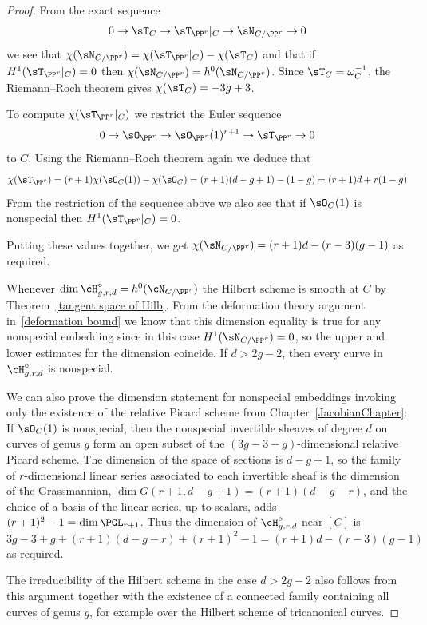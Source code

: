 \begin{proof}
From the exact sequence
$$
0 \to \sT_C \to \sT_{\PP^r}|_C \to \sN_{C/\PP^r} \to 0
$$
we see that $\chi(\sN_{C/\PP^r}) = \chi(\sT_{\PP^r}|_C) - \chi(\sT_C)$
and that if $H^1( \sT_{\PP^r}|_C) = 0$ then $\chi(\sN_{C/\PP^r}) =
h^0(\sN_{C/\PP^r})$.
Since $\sT_C = \omega_C^{-1}$, the Riemann--Roch theorem gives $\chi(\sT_C)
= -3g+3$.

To compute $\chi(\sT_{\PP^r}|_C)$ we restrict the Euler sequence
$$
0\to \sO_{\PP^r} \to \sO_{\PP^r}(1)^{r+1} \to \sT_{\PP^r} \to 0
$$
to $C$.
Using the 
%
Riemann--Roch theorem
again we deduce that
$$
\chi( \sT_{\PP^r} ) = (r+1)\chi(\sO_C(1)) - \chi(\sO_C) = (r+1)(d-g+1) -
(1-g) = (r+1)d + r(1-g)
$$
From the restriction of the sequence above we also see that
if $\sO_C(1)$ is nonspecial then $H^1(\sT_{\PP^r}|_C) = 0$.

Putting these values together, we get
$
\chi(\sN_{C/\PP^r}) = (r+1)d - (r-3)(g-1)
$
as required.

Whenever $\dim \cH^\circ_{g,r,d} = h^{0}(\cN_{C/\PP^{r}}) $ the Hilbert
scheme is smooth at $C$ by
Theorem~\ref{tangent space of Hilb}.
From the deformation theory argument
in~\ref{deformation bound} we know that this dimension equality is true
for any
nonspecial embedding since in this case
$H^1(\sN_{C/\PP^r}) = 0$, so the upper and lower estimates for the
dimension
coincide. If $d>2g-2$, then every curve in $\cH^\circ_{g,r,d}$ is
nonspecial.

We can also prove the dimension statement for nonspecial embeddings
invoking only the existence of the relative Picard scheme from
Chapter~\ref{JacobianChapter}:
If $\sO_C(1)$ is nonspecial, then the
nonspecial invertible sheaves of degree $d$ on curves of genus $g$
 form an open subset of the $(3g-3+ g)$-dimensional relative Picard
 scheme. The dimension
 of the space of sections is $d-g+1$, so the family of $r$-dimensional
 linear series associated to
 each invertible sheaf is the dimension of the Grassmannian, $\dim G(r+1,
 d-g+1) = (r+1)(d-g-r)$,
 and the choice of a basis of the linear series, up to scalars, adds
 $(r+1)^2-1 = \dim \PGL_{r+1}$.
 Thus the dimension of  $\cH^\circ_{g,r,d}$ near $[C]$ is
$$
3g-3+ g + (r+1)(d-g-r) + (r+1)^2-1 = (r+1)d - (r-3)(g-1)
$$
as required.

The irreducibility of the Hilbert scheme in the case $d>2g-2$ also
follows from this argument
together with the existence of a connected family containing all curves
of genus $g$, for example over the
Hilbert scheme of 
%
tricanonical curves.
\end{proof}


